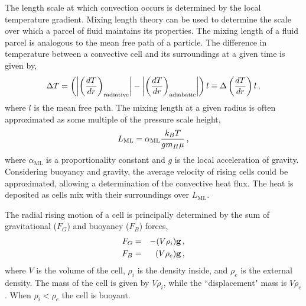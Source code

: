 The length scale at which convection occurs is determined by the local temperature gradient.
Mixing length theory can be used to determine the scale over which a parcel of fluid maintains its properties. The mixing length of a fluid parcel is analogous to the mean free path of a particle. The difference in temperature between a convective cell and its surroundings at a given time is given by,
\begin{equation}
\Delta T = \left(\left|\left(\frac{dT}{dr}\right)_{\mathrm{radiative}}\right|-\left|\left(\frac{dT}{dr}\right)_{\mathrm{adiabatic}}\right|\right) l  \equiv \Delta \left( \frac{dT}{dr} \right) l \mbox{\,,}
\end{equation}
where $l$ is the mean free path. The mixing length at a given radius is often approximated as some multiple of the pressure scale height,
\begin{equation}
L_\mathrm{ML} = \alpha_\mathrm{ML} \frac{k_{B}T}{g m_H \mu} \mbox{\,,}
\end{equation}
where $\alpha_\mathrm{ML}$ is a proportionality constant and $g$ is the local acceleration of gravity. Considering buoyancy and gravity, the average velocity of rising cells could be approximated, allowing a determination of the convective heat flux. The heat is deposited as cells mix with their surroundings over $L_\mathrm{ML}$. 

The radial rising motion of a cell is principally determined by the sum of gravitational ($F_{G}$) and buoyancy ($F_{B}$) forces,
\begin{eqnarray}
F_{G} &=& -(V \rho_{i}) \vec{g} \mbox{\,,} \\
F_{B} &=& (V \rho_{e}) \vec{g} \mbox{\,,}
\end{eqnarray}
where $V$ is the volume of the cell, $\rho_{i}$ is the density inside, and $\rho_{e}$ is the external density. The mass of the cell is given by $V \rho_{i}$, while the ``displacement" mass is $V \rho_{e}$. When $\rho_{i} < \rho_{e}$ the cell is buoyant.


